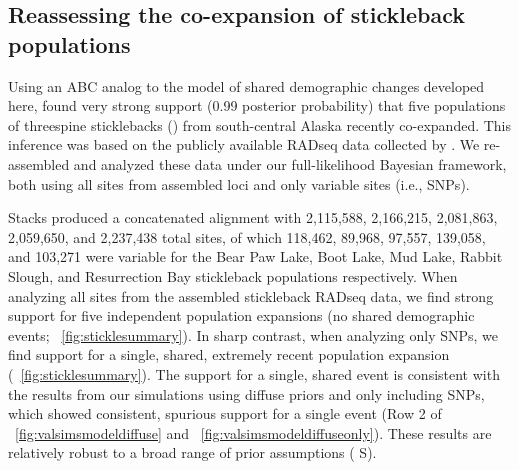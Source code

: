 

\subsection{Reassessing the co-expansion of stickleback populations}

Using an ABC analog to the model of shared demographic changes developed here,
\citet{Xue2015} found very strong support (0.99 posterior probability) that
five populations of threespine sticklebacks ()
from south-central Alaska recently
co-expanded.
This inference was based on the publicly available RADseq data collected by
\citet{Hohenlohe2010}.
We re-assembled and analyzed these data under our full-likelihood
Bayesian framework, both using all sites from assembled loci
and only variable sites (i.e., SNPs).


Stacks produced a concatenated alignment with
2,115,588,
2,166,215,
2,081,863,
2,059,650, and
2,237,438
total sites, of which
118,462,
89,968,
97,557,
139,058, and
103,271
were variable for the Bear Paw Lake, Boot Lake, Mud Lake, Rabbit Slough, and
Resurrection Bay stickleback populations respectively.
When analyzing all sites from the assembled stickleback
RADseq data, we find strong support for five independent
population expansions (no shared demographic events;
\fig{}~\ref{fig:sticklesummary}).
In sharp contrast, when analyzing only SNPs, we find
support for a single, shared, extremely recent population expansion
(\fig{}~\ref{fig:sticklesummary}).
The support for a single, shared event is consistent with the results from our
simulations using diffuse priors and only including SNPs, which showed
consistent, spurious support for a single event
(Row 2 of \fig{}~\ref{fig:valsimsmodeldiffuse}
and \fig{}~\ref{fig:valsimsmodeldiffuseonly}).
These results are relatively robust to a broad range of prior
assumptions
(\figs
S).

\ifembed{

}{}


